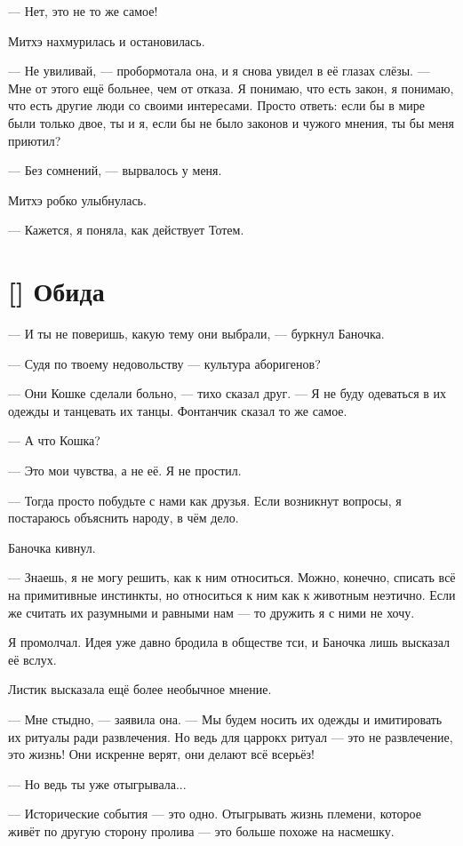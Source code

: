--- Нет, это не то же самое!

Митхэ нахмурилась и остановилась.

--- Не увиливай, --- пробормотала она, и я снова увидел в её глазах слёзы.
--- Мне от этого ещё больнее, чем от отказа.
Я понимаю, что есть закон, я понимаю, что есть другие люди со своими интересами.
Просто ответь: если бы в мире были только двое, ты и я, если бы не было законов и чужого мнения, ты бы меня приютил?

--- Без сомнений, --- вырвалось у меня.

Митхэ робко улыбнулась.

--- Кажется, я поняла, как действует Тотем.

\section{[] Обида}

--- И ты не поверишь, какую тему они выбрали, --- буркнул Баночка.

--- Судя по твоему недовольству --- культура аборигенов?

--- Они Кошке сделали больно, --- тихо сказал друг.
--- Я не буду одеваться в их одежды и танцевать их танцы.
Фонтанчик сказал то же самое.

--- А что Кошка?

--- Это мои чувства, а не её.
Я не простил.

--- Тогда просто побудьте с нами как друзья.
Если возникнут вопросы, я постараюсь объяснить народу, в чём дело.

Баночка кивнул.

--- Знаешь, я не могу решить, как к ним относиться.
Можно, конечно, списать всё на примитивные инстинкты, но относиться к ним как к животным неэтично.
Если же считать их разумными и равными нам --- то дружить я с ними не хочу.

Я промолчал.
Идея уже давно бродила в обществе тси, и Баночка лишь высказал её вслух.

Листик высказала ещё более необычное мнение.

--- Мне стыдно, --- заявила она.
--- Мы будем носить их одежды и имитировать их ритуалы ради развлечения.
Но ведь для царрокх ритуал --- это не развлечение, это жизнь!
Они искренне верят, они делают всё всерьёз!

--- Но ведь ты уже отыгрывала...

--- Исторические события --- это одно.
Отыгрывать жизнь племени, которое живёт по другую сторону пролива --- это больше похоже на насмешку.

